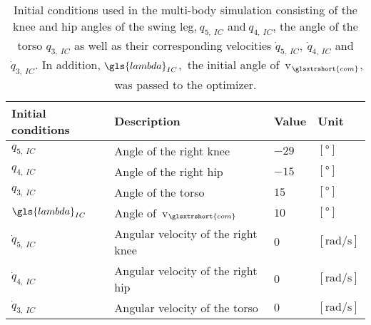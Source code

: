        \begin{table}[H]
            \caption{Initial conditions used in the multi-body simulation consisting of the knee and hip angles of the swing leg,$~q_{5,~IC}$ and$~q_{4,~IC}$, the angle of the torso $q_{3,~IC}$ as well as their corresponding velocities $\dot{q}_{5,~IC},~\dot{q}_{4,~IC}$ and$~\dot{q}_{3,~IC}$. In addition,$~\gls{lambda}_{IC}$,~\ie the initial angle of~\gls{v}$_{\glsxtrshort{com}}$, was passed to the optimizer.} 
            \label{tab:initial-conditions}
            \begin{center}
                \begin{tabular}{ l|l|l|l }
                    \textbf{Initial conditions}     & \textbf{Description}                      & \textbf{Value}    & \textbf{Unit}                            \\ [0.5ex]
                    \hline \hline
                    $q_{5,~IC}$               & Angle of the right knee                   & $-29$             & $\left[\si{\degree}\right]$              \\
                    $q_{4,~IC}$               & Angle of the right hip                    & $-15$             & $\left[\si{\degree}\right]$              \\
                    $q_{3,~IC}$               & Angle of the torso                        & $15$              & $\left[\si{\degree}\right]$              \\
                    $\gls{lambda}_{IC}$                  & Angle of~\gls{v}$_{\glsxtrshort{com}}$    & $10$              & $\left[\si{\degree}\right]$              \\
                    $\dot{q}_{5,~IC}$         & Angular velocity of the right knee        & $0$               & $\left[\si{\radian\per\second}\right]$   \\
                    $\dot{q}_{4,~IC}$         & Angular velocity of the right hip         & $0$               & $\left[\si{\radian\per\second}\right]$   \\
                    $\dot{q}_{3,~IC}$         & Angular velocity of the torso             & $0$               & $\left[\si{\radian\per\second}\right]$   \\
                \end{tabular}
            \end{center}
        \end{table}
        
        
